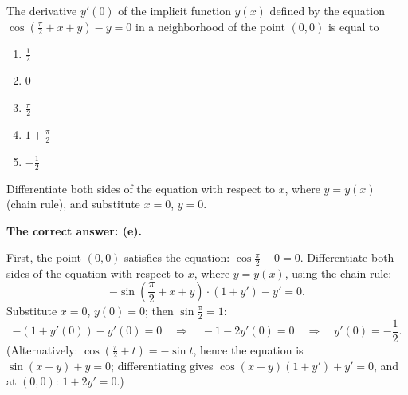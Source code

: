 
\begin{question}
The derivative $y'(0)$ of the implicit function $y(x)$ defined by the equation $\cos\left(\frac{\pi}{2}+x+y\right)-y=0$ in a neighborhood of the point $(0,0)$ is equal to
\begin{enumerate}
  \item[(a)] $\frac12$
  \item[(b)] $0$
  \item[(c)] $\frac{\pi}{2}$
  \item[(d)] $1+\frac{\pi}{2}$
  \item[(e)] $-\frac12$
\end{enumerate}
\end{question}

\begin{hint}
Differentiate both sides of the equation with respect to $x$, where $y=y(x)$ (chain rule), and substitute $x=0$, $y=0$.
\end{hint}

\begin{solution}
\textbf{The correct answer: (e).}

First, the point $(0,0)$ satisfies the equation: $\cos\frac{\pi}{2}-0=0$. Differentiate both sides of the equation with respect to $x$, where $y=y(x)$, using the chain rule:
\[ -\sin\left(\frac{\pi}{2}+x+y\right)\cdot\left(1+y'\right) - y' = 0. \]
Substitute $x=0$, $y(0)=0$; then $\sin\frac{\pi}{2}=1$:
\[ -(1+y'(0)) - y'(0) = 0 \quad\Longrightarrow\quad -1-2y'(0)=0 \quad\Longrightarrow\quad y'(0) = -\frac12. \]
(Alternatively: $\cos\left(\frac\pi2+t\right)=-\sin t$, hence the equation is $\sin(x+y)+y=0$; differentiating gives $\cos(x+y)(1+y')+y'=0$, and at $(0,0)$: $1+2y'=0$.)
\end{solution}
